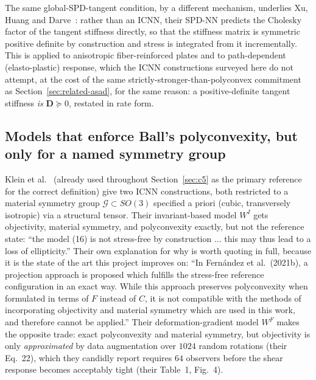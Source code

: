 \documentclass[10pt,a4paper]{article}
\begin{document}
The same global-SPD-tangent condition, by a different mechanism, underlies
Xu, Huang and Darve~\cite{Xu2021}: rather than an ICNN, their SPD-NN
predicts the Cholesky factor of the tangent stiffness directly, so that
the stiffness matrix is symmetric positive definite by construction and
stress is integrated from it incrementally. This is applied to anisotropic
fiber-reinforced plates and to path-dependent (elasto-plastic) response,
which the ICNN constructions surveyed here do not attempt, at the cost of
the same strictly-stronger-than-polyconvex commitment as
Section~\ref{sec:related-asad}, for the same reason: a positive-definite
tangent stiffness \emph{is} $\bm D\succeq0$, restated in rate form.

\subsection{Models that enforce Ball's polyconvexity, but only for a named symmetry group}
\label{sec:related-klein-linden}
Klein et al.~\cite{Klein2022} (already used throughout
Section~\ref{sec:c5} as the primary reference for the correct definition)
give two ICNN constructions, both restricted to a material symmetry group
$\mathcal G\subset SO(3)$ specified a priori (cubic, transversely
isotropic) via a structural tensor.  Their invariant-based model $W^I$
gets objectivity, material symmetry, and polyconvexity exactly, but not
the reference state: ``the model (16) is not stress-free by construction
$\dots$ this may thus lead to a loss of ellipticity.'' Their own
explanation for why is worth quoting in full, because it is the state of
the art this project improves on: ``In Fern\'andez et al.\ (2021b), a
projection approach is proposed which fulfills the stress-free reference
configuration in an exact way. While this approach preserves polyconvexity
when formulated in terms of $F$ instead of $C$, it is not compatible with
the methods of incorporating objectivity and material symmetry which are
used in this work, and therefore cannot be applied.'' Their
deformation-gradient model $W^F$ makes the opposite trade: exact
polyconvexity and material symmetry, but objectivity is only
\emph{approximated} by data augmentation over $1024$ random rotations
(their Eq.~22), which they candidly report requires $64$ observers before
the shear response becomes acceptably tight (their Table~1, Fig.~4).
\end{document}
